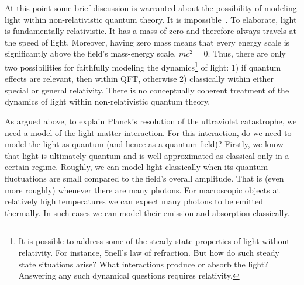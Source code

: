 \documentclass[12pt,prd,superscriptaddress,floatfix,amsmath,amssymb,amsfonts,nofootinbib]{revtex4-2}
\begin{document}
At this point some brief discussion is warranted about the possibility of modeling light within non-relativistic quantum theory. It is impossible~\cite{Lamb1995}. To elaborate, light is fundamentally relativistic. It has a mass of zero and therefore always travels at the speed of light. Moreover, having zero mass means that every energy scale is significantly above the field's mass-energy scale, $mc^2=0$. Thus, there are only two possibilities for faithfully modeling the dynamics\footnote{It is possible to address some of the steady-state properties of light without relativity. For instance, Snell's law of refraction. But how do such steady state situations arise? What interactions produce or absorb the light? Answering any such dynamical questions requires relativity.} of light: 1) if quantum effects are relevant, then within QFT, otherwise 2) classically within either special or general relativity. There is no conceptually coherent treatment of the dynamics of light within non-relativistic quantum theory.

As argued above, to explain Planck's resolution of the ultraviolet catastrophe, we need a model of the light-matter interaction. For this interaction, do we need to model the light as quantum (and hence as a quantum field)? Firstly, we know that light is ultimately quantum and is well-approximated as classical only in a certain regime. Roughly, we can model light classically when its quantum fluctuations are small compared to the field's overall amplitude. That is (even more roughly) whenever there are many photons. For macroscopic objects at relatively high temperatures we can expect many photons to be emitted thermally. In such cases we can model their emission and absorption classically.
\end{document}
